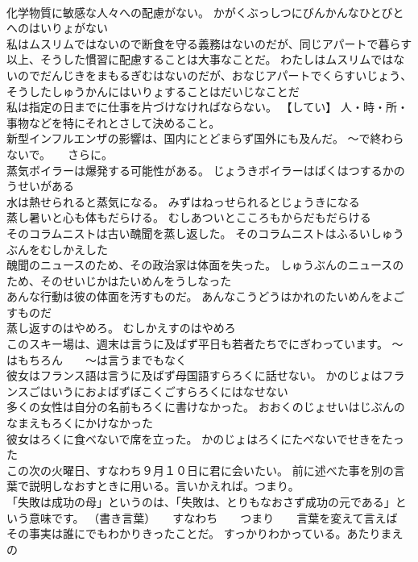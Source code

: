 \documentclass[8pt]{extreport}
\begin{document}
\begin{CJK}{UTF8}{min}
\\	化学物質に敏感な人々への配慮がない。	かがくぶっしつにびんかんなひとびとへのはいりょがない 
\\	私はムスリムではないので断食を守る義務はないのだが、同じアパートで暮らす以上、そうした慣習に配慮することは大事なことだ。	わたしはムスリムではないのでだんじきをまもるぎむはないのだが、おなじアパートでくらすいじょう、そうしたしゅうかんにはいりょすることはだいじなことだ 
\\	私は指定の日までに仕事を片づけなければならない。	【してい】 人・時・所・事物などを特にそれとさして決めること。
\\	新型インフルエンザの影響は、国内にとどまらず国外にも及んだ。	～で終わらないで。　　さらに。
\\	蒸気ボイラーは爆発する可能性がある。	じょうきボイラーはばくはつするかのうせいがある 
\\	水は熱せられると蒸気になる。	みずはねっせられるとじょうきになる 
\\	蒸し暑いと心も体もだらける。	むしあついとこころもからだもだらける 
\\	そのコラムニストは古い醜聞を蒸し返した。	そのコラムニストはふるいしゅうぶんをむしかえした 
\\	醜聞のニュースのため、その政治家は体面を失った。	しゅうぶんのニュースのため、そのせいじかはたいめんをうしなった 
\\	あんな行動は彼の体面を汚すものだ。	あんなこうどうはかれのたいめんをよごすものだ 
\\	蒸し返すのはやめろ。	むしかえすのはやめろ 
\\	このスキー場は、週末は言うに及ばず平日も若者たちでにぎわっています。	～はもちろん　　～は言うまでもなく
\\	彼女はフランス語は言うに及ばず母国語すらろくに話せない。	かのじょはフランスごはいうにおよばずぼこくごすらろくにはなせない 
\\	多くの女性は自分の名前もろくに書けなかった。	おおくのじょせいはじぶんのなまえもろくにかけなかった 
\\	彼女はろくに食べないで席を立った。	かのじょはろくにたべないでせきをたった 
\\	この次の火曜日、すなわち９月１０日に君に会いたい。	前に述べた事を別の言葉で説明しなおすときに用いる。言いかえれば。つまり。
\\	「失敗は成功の母」というのは、「失敗は、とりもなおさず成功の元である」という意味です。	（書き言葉）　　すなわち　　つまり　　言葉を変えて言えば
\\	その事実は誰にでもわかりきったことだ。	すっかりわかっている。あたりまえの

\end{CJK}
\end{document}

